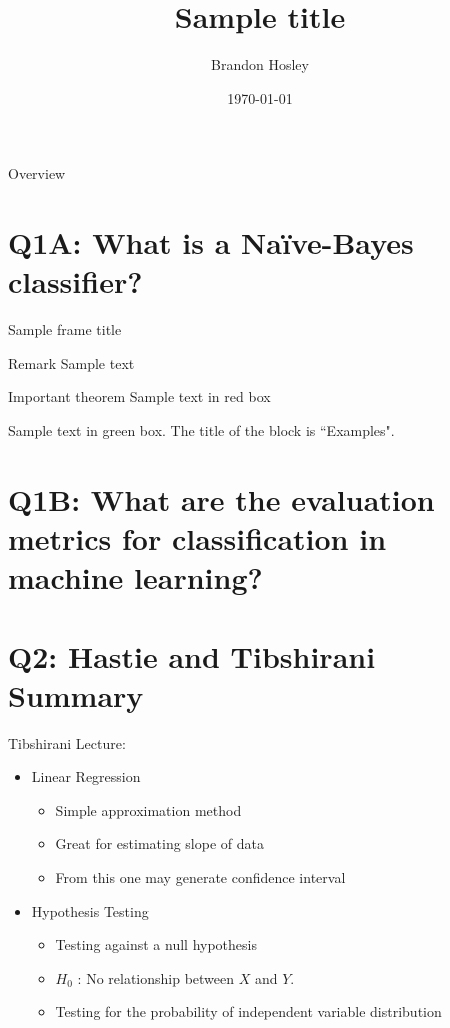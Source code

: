 \documentclass{beamer}
\title{Sample title}
\author{Brandon Hosley}
\institute{University of Illinois - Springfield}
\date{\today}
\begin{document}
\frame{\titlepage}

\begin{frame}{Overview}
\tableofcontents
\end{frame}

\section[Q1.1]{Q1A: What is a Na\"{i}ve-Bayes classifier?}

\begin{frame}{Sample frame title}
\begin{block}{Remark}
	Sample text
\end{block}

\begin{alertblock}{Important theorem}
	Sample text in red box
\end{alertblock}

\begin{examples}
	Sample text in green box. The title of the block is ``Examples".
\end{examples}

\end{frame}

\section[Q1.2]{Q1B: What are the evaluation metrics for classification in machine learning?}

\section[Q2]{Q2: Hastie and Tibshirani Summary}

\begin{frame}{Tibshirani Lecture: }
\begin{itemize}
	\item<1-> Linear Regression
	\begin{itemize}
		\item<1-> Simple approximation method
		\item<1-> Great for estimating slope of data
		\item<1-> From this one may generate confidence interval
	\end{itemize}
	\item<2> Hypothesis Testing
	\begin{itemize}
		\item<2> Testing against a null hypothesis
		\item<2>[] $H_0$ : No relationship between $X$ and $Y$.
		\item<2> Testing for the probability of independent variable distribution 
	\end{itemize}
\end{itemize}
\end{frame}
\end{document}
